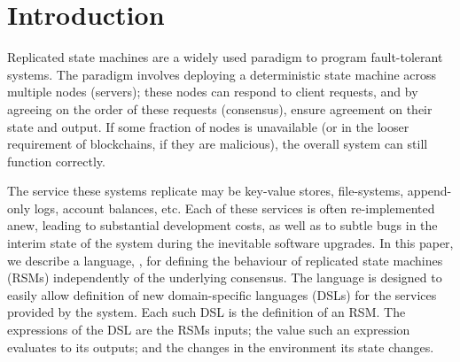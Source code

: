 \section{Introduction}
\label{s:introduction}







Replicated state machines are a widely used paradigm to program fault-tolerant
systems. The paradigm involves deploying a deterministic state machine across
multiple nodes (servers); these nodes can respond to client requests, and by
agreeing on the order of these requests (consensus), ensure agreement on their
state and output. If some fraction of nodes is unavailable (or in the looser
requirement of blockchains, if they are malicious), the overall system can
still function correctly.

The service these systems replicate may be key-value stores, file-systems,
append-only logs, account balances, etc. Each of these
services is often re-implemented anew, leading to substantial development
costs, as well as to subtle bugs in the interim state of the system during the
inevitable software upgrades. In this paper, we describe a language, \rad, for
defining the behaviour of replicated state machines (RSMs) independently of the
underlying consensus. The language is designed to easily allow definition of
new domain-specific languages (DSLs) for the services provided by the system.
Each such DSL is the definition of an RSM. The expressions of the DSL
are the RSMs inputs; the value such an expression evaluates to its outputs; and
the changes in the environment its state changes.

